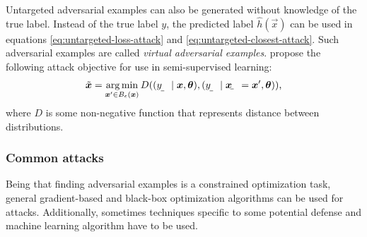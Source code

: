\documentclass{article}
\begin{document}
Untargeted adversarial examples can also be generated without knowledge of the true label. Instead of the true label $y$, the predicted label $\hat{h}(\vec x)$ can be used in equations \eqref{eq:untargeted-loss-attack} and \eqref{eq:untargeted-closest-attack}. Such adversarial examples are called \textit{virtual adversarial examples}.
\citet{Miyato:2017:VATRMSSSL} propose the following attack objective for use in semi-supervised learning:
\begin{align}
    \tilde{\vec x} = \argmin_{\vec x'\in B_\epsilon(\vec x)} D((\rvar y\mid \vec x, \vec\theta), (\rvar y\mid \rvec x = \vec x', \vec\theta)) \text{,}
\end{align}
where $D$ is some non-negative function that represents distance between distributions.

\subsubsection{Common attacks}

Being that finding adversarial examples is a constrained optimization task, general gradient-based and black-box optimization algorithms can be used for attacks. Additionally, sometimes techniques specific to some potential defense and machine learning algorithm have to be used.
\end{document}
